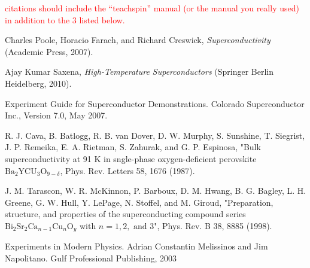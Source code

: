 \documentclass[prb,preprint]{revtex4-1}
\begin{document}
\textcolor{red}{citations should include the ``teachspin'' manual (or the manual you really used) in addition to the 3 listed below. }


\begin{thebibliography}{99}

 Charles Poole, Horacio Farach, and Richard Creswick, \textit{Superconductivity} (Academic Press, 2007).

 Ajay Kumar Saxena, \textit{High-Temperature Superconductors} (Springer Berlin Heidelberg, 2010).

 Experiment Guide for Superconductor Demonstrations. Colorado Superconductor Inc., Version 7.0, May 2007.

 R. J. Cava, B. Batlogg, R. B. van Dover, D. W. Murphy, S. Sunshine, T. Siegrist, J. P. Remeika, E. A. Rietman, S. Zahurak, and G. P. Espinosa, "Bulk superconductivity at 91 K in sngle-phase oxygen-deficient perovskite $\textrm{Ba}_2\textrm{YCU}_3\textrm{O}_{9-\delta}$, Phys. Rev. Letters 58, 1676 (1987).

 J. M. Tarascon, W. R. McKinnon, P. Barboux, D. M. Hwang, B. G. Bagley, L. H. Greene, G. W. Hull, Y. LePage, N. Stoffel, and M. Giroud, "Preparation, structure, and properties of the superconducting compound series $\textrm{Bi}_2\textrm{Sr}_2\textrm{Ca}_{n-1}\textrm{Cu}_{n}\textrm{O}_y$ with $n=1,2,\textrm{ and }3$", Phys. Rev. B 38, 8885 (1998).

 Experiments in Modern Physics.  Adrian Constantin Melissinos and Jim Napolitano.  Gulf Professional Publishing, 2003



\end{thebibliography}


\end{document}
